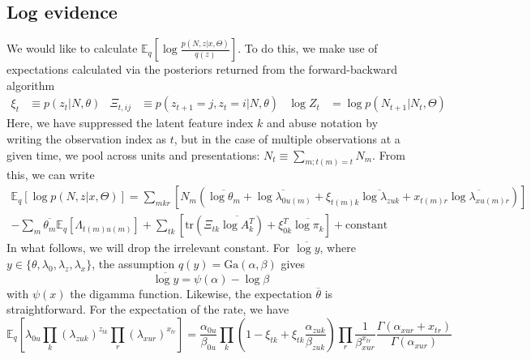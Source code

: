 \documentclass[12pt,a4paper]{article}
\begin{document}
\begin{flushleft}
\subsection{Log evidence}
\label{sec:log_evidence}
We would like to calculate $\mathbb{E}_{q}\left[ \log \frac{p(N, z|x, \Theta)}{q(z)}\right]$. To do this, we make use of expectations calculated via the posteriors returned from the forward-backward algorithm
\begin{align}
    \xi_{t} &\equiv p(z_{t}|N, \theta) &
    \Xi_{t, ij} &\equiv p(z_{t+1} = j, z_{t} = i|N, \theta) &
    \log Z_{t} &= \log p(N_{t+1}|N_{t}, \Theta)
\end{align}
Here, we have suppressed the latent feature index $k$ and abuse notation by writing the observation index as $t$, but in the case of multiple observations at a given time, we pool across units and presentations: $N_t \equiv \sum_{m; t(m) = t} N_m$. From this, we can write
\begin{multline}
    \label{eq:log_evidence}
     \mathbb{E}_{q}\left[ \log p(N, z|x, \Theta) \right] =
     \sum_{mkr} \left[N_m \left(
        \overline{\log \theta_m} + \overline{\log \lambda_{0u(m)}} +
        \xi_{t(m)k}\overline{\log \lambda_{zuk}} +
        x_{t(m)r} \overline{\log \lambda_{xu(m)r}}
     \right) \right] \\
     - \sum_m \overline{\theta_m} \mathbb{E}_q\left[\Lambda_{t(m)u(m)} \right]
      + \sum_{tk} \left[ \text{tr}\left(\Xi_{tk} \overline{\log A_k^T} \right)
     + \xi_{0k}^T \overline{\log \pi_k}
     \right]
    + \text{constant}
 \end{multline}
In what follows, we will drop the irrelevant constant. For $\overline{\log y}$, where $y \in \lbrace \theta, \lambda_0, \lambda_z, \lambda_x \rbrace$, the assumption $q(y) = \text{Ga}(\alpha, \beta)$ gives
\begin{equation}
    \overline{\log y} = \psi(\alpha) - \log \beta
\end{equation}
with $\psi(x)$ the digamma function. Likewise, the expectation $\overline{\theta}$ is straightforward. For the expectation of the rate, we have
\begin{equation}
    \label{eff_rate}
    \mathbb{E}_q\left[
        \lambda_{0u} \prod_k (\lambda_{zuk})^{z_{tk}} \prod_r (\lambda_{xur})^{x_{tr}}
    \right] = \frac{\alpha_{0u}}{\beta_{0u}}
    \prod_k \left(1 - \xi_{tk} + \xi_{tk} \frac{\alpha_{zuk}}{\beta_{zuk}} \right)
    \prod_r \frac{1}{\beta_{xur}^{x_{tr}}} \frac{\Gamma(\alpha_{xur} + x_{tr})}{\Gamma(\alpha_{xur})}
\end{equation}

\end{flushleft}
\end{document}
